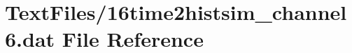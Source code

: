 \hypertarget{16time2histsim__channel6_8dat}{}\section{Text\+Files/16time2histsim\+\_\+channel6.dat File Reference}
\label{16time2histsim__channel6_8dat}
